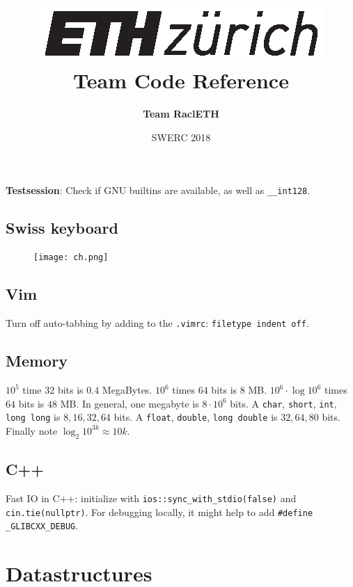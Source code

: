 \documentclass[
	a4paper,
	landscape,
	10pt,
	article
]{article}
\title{
	\vspace{-4em}
	\includegraphics[scale=0.6]{./eth-logo.eps}\\
	\vspace{-1em}
	Team Code Reference
	\vspace{-0.7em}
}
\author{
	\Large \textbf{Team RaclETH}\\
}
\date{
	\vspace{-0.7em}
	SWERC 2018
	\vspace{-1.9em}
}
\newcommand{\entry}[3]{
	\subsection{#1}
	#2
	\ifthenelse{\equal{#3}{}}{}{}
}
\begin{document}
\setlength{\abovedisplayskip}{0pt}
\setlength{\belowdisplayskip}{0pt}
\setlength{\abovedisplayshortskip}{0pt}
\setlength{\belowdisplayshortskip}{0pt}

{\let\newpage\relax\maketitle}
\tableofcontents
\textbf{Testsession}: Check if GNU builtins are available, as well as \texttt{\_\_int128}.
\thispagestyle{empty}
\newpage



\subsection{Swiss keyboard}
\begin{figure}[H]
	\centering
	\texttt{[image: ch.png]}
\end{figure}

\subsection{Vim}
Turn off auto-tabbing by adding to the \texttt{.vimrc}: \texttt{filetype indent off}.

\subsection{Memory}
$10^5$ time $32$ bits is $0.4$ MegaBytes.
$10^6$ times $64$ bits is $8$ MB.
$10^6 \cdot \log 10^6$ times $64$ bits is $48$ MB.
In general, one megabyte is $8\cdot10^6$ bits. A \texttt{char},
\texttt{short}, \texttt{int}, \texttt{long long} is $8,16,32,64$
bits. A \texttt{float}, \texttt{double}, \texttt{long double} is
$32,64,80$ bits. Finally note $\log_2 10^{3k} \approx 10k$.

\subsection{C++}
Fast IO in C++: initialize with \texttt{ios::sync\_with\_stdio(false)}
and \texttt{cin.tie(nullptr)}. For debugging locally, it might help to
add \texttt{\#define \_GLIBCXX\_DEBUG}.

\section{Datastructures}
\end{document}

